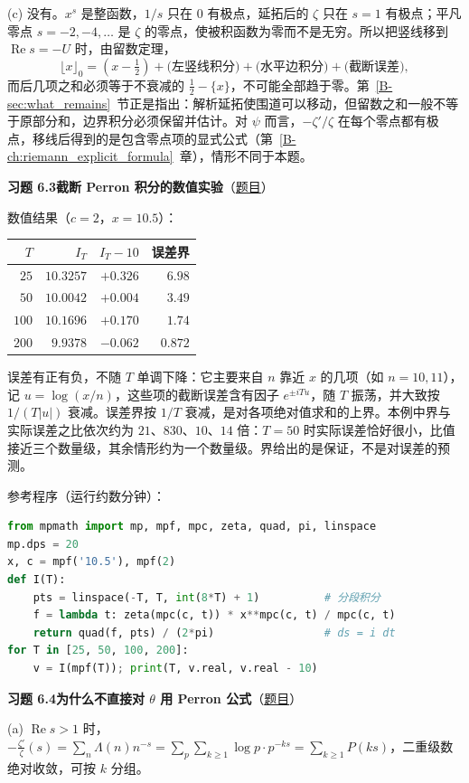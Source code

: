 \documentclass[11pt,a4paper]{article}
\renewcommand{\Re}{\operatorname{Re}}
\newcommand{\bref}[1]{\ref*{B-#1}}
\newcommand{\Sol}[2]{%
  \par\addvspace{1.2em}\noindent
  \hypertarget{s:#1}{}\textbf{习题 #1\quad #2}\hfill{\small（\hyperlink{q:#1}{题目}）}\par
  \nopagebreak\smallskip}
\begin{document}
(c) 没有。$x^s$ 是整函数，$1/s$ 只在 $0$ 有极点，延拓后的 $\zeta$ 只在 $s=1$ 有极点；平凡零点 $s=-2,-4,\dots$ 是 $\zeta$ 的零点，使被积函数为零而不是无穷。所以把竖线移到 $\Re s=-U$ 时，由留数定理，
\[
  \lfloor x\rfloor_0=(x-\tfrac12)+\bigl(\text{左竖线积分}\bigr)+\bigl(\text{水平边积分}\bigr)+\bigl(\text{截断误差}\bigr),
\]
而后几项之和必须等于不衰减的 $\tfrac12-\{x\}$，不可能全部趋于零。第~\bref{sec:what_remains}~节正是指出：解析延拓使围道可以移动，但留数之和一般不等于原部分和，边界积分必须保留并估计。对 $\psi$ 而言，$-\zeta'/\zeta$ 在每个零点都有极点，移线后得到的是包含零点项的显式公式（第~\bref{ch:riemann_explicit_formula}~章），情形不同于本题。

\Sol{6.3}{截断 Perron 积分的数值实验}
数值结果（$c=2$，$x=10.5$）：
\begin{center}
\begin{tabular}{rrrr}
\toprule
$T$ & $I_T$ & $I_T-10$ & 误差界\\
\midrule
$25$ & $10.3257$ & $+0.326$ & $6.98$\\
$50$ & $10.0042$ & $+0.004$ & $3.49$\\
$100$ & $10.1696$ & $+0.170$ & $1.74$\\
$200$ & $9.9378$ & $-0.062$ & $0.872$\\
\bottomrule
\end{tabular}
\end{center}
误差有正有负，不随 $T$ 单调下降：它主要来自 $n$ 靠近 $x$ 的几项（如 $n=10,11$），记 $u=\log(x/n)$，这些项的截断误差含有因子 $e^{\pm iTu}$，随 $T$ 振荡，并大致按 $1/(T|u|)$ 衰减。误差界按 $1/T$ 衰减，是对各项绝对值求和的上界。本例中界与实际误差之比依次约为 $21$、$830$、$10$、$14$ 倍：$T=50$ 时实际误差恰好很小，比值接近三个数量级，其余情形约为一个数量级。界给出的是保证，不是对误差的预测。

参考程序（运行约数分钟）：
\begin{lstlisting}[language=Python]
from mpmath import mp, mpf, mpc, zeta, quad, pi, linspace
mp.dps = 20
x, c = mpf('10.5'), mpf(2)
def I(T):
    pts = linspace(-T, T, int(8*T) + 1)          # 分段积分
    f = lambda t: zeta(mpc(c, t)) * x**mpc(c, t) / mpc(c, t)
    return quad(f, pts) / (2*pi)                 # ds = i dt
for T in [25, 50, 100, 200]:
    v = I(mpf(T)); print(T, v.real, v.real - 10)
\end{lstlisting}

\Sol{6.4}{为什么不直接对 $\theta$ 用 Perron 公式}
(a) $\Re s>1$ 时，$-\frac{\zeta'}{\zeta}(s)=\sum_n\Lambda(n)n^{-s}=\sum_p\sum_{k\ge1}\log p\cdot p^{-ks}=\sum_{k\ge1}P(ks)$，二重级数绝对收敛，可按 $k$ 分组。
\end{document}
